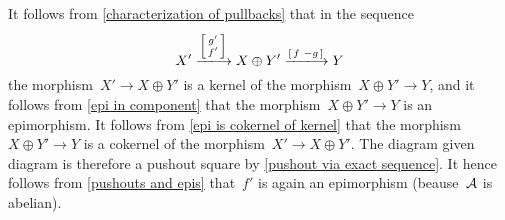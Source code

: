 It follows from \cref{characterization of pullbacks} that in the sequence
\[
    X'
  \xlongto{ \begin{bsmallmatrix} g' \\ f' \end{bsmallmatrix} }
    X \oplus Y'
  \xlongto{ \begin{bsmallmatrix} f & -g \end{bsmallmatrix} }
    Y
\]
the morphism~$X' \to X \oplus Y'$ is a kernel of the morphism~$X \oplus Y' \to Y$, and it follows from \cref{epi in component} that the morphism~$X \oplus Y' \to Y$ is an epimorphism.
It follows from \cref{epi is cokernel of kernel} that the morphism~$X \oplus Y' \to Y$ is a cokernel of the morphism~$X' \to X \oplus Y'$.
The diagram given diagram is therefore a pushout square by \cref{pushout via exact sequence}.
It hence follows from \cref{pushouts and epis} that~$f'$ is again an epimorphism (beause~$\mathcal{A}$ is abelian).
